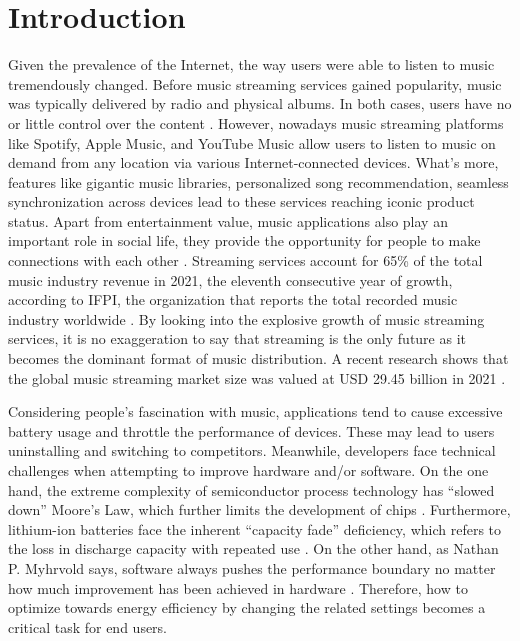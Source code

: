 \section{Introduction}
Given the prevalence of the Internet, the way users were able to listen to music tremendously changed. Before music streaming services gained popularity, music was typically delivered by radio and physical albums. In both cases, users have no or little control over the content \cite{hiller2017rise}. However, nowadays music streaming platforms like Spotify, Apple Music, and YouTube Music allow users to listen to music on demand from any location via various Internet-connected devices. What’s more, features like gigantic music libraries, personalized song recommendation, seamless synchronization across devices lead to these services reaching iconic product status. Apart from entertainment value, music applications also play an important role in social life, \eg they provide the opportunity for people to make connections with each other \cite{oyedele2018streaming}. Streaming services account for 65\% of the total music industry revenue in 2021, the eleventh consecutive year of growth, according to IFPI, the organization that reports the total recorded music industry worldwide \cite{3}. 
By looking into the explosive growth of music streaming services, it is no exaggeration to say that streaming is the only future as it becomes the dominant format of music distribution. A recent research shows that the global music streaming market size was valued at USD 29.45 billion in 2021 \cite{4}.

Considering people’s fascination with music, applications tend to cause excessive battery usage and throttle the performance of devices. These may lead to users uninstalling and switching to competitors. Meanwhile, developers face technical challenges when attempting to improve hardware and/or software. On the one hand, the extreme complexity of semiconductor process technology has “slowed down” Moore’s Law, which further limits the development of chips \cite{waldrop2016chips}. Furthermore, lithium-ion batteries face the inherent “capacity fade” deficiency, which refers to the loss in discharge capacity with repeated use \cite{spotnitz2003simulation}. On the other hand, as Nathan P. Myhrvold says, software always pushes the performance boundary no matter how much improvement has been achieved in hardware {}. Therefore, how to optimize towards energy efficiency by changing the related settings becomes a critical task for end users. 

